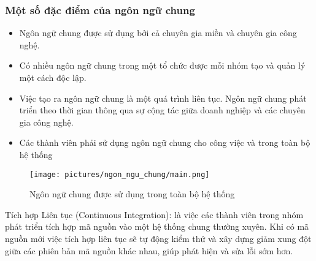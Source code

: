 \subsubsection{Một số đặc điểm của ngôn ngữ chung}

\begin{itemize}

    \item Ngôn ngữ chung được sử dụng bởi cả chuyên gia  miền    và chuyên gia công nghệ.

    \item Có nhiều ngôn ngữ chung trong một tổ chức được mỗi nhóm tạo và quản lý một cách độc lập.

    \item Việc tạo ra ngôn ngữ chung là một quá trình liên tục. Ngôn ngữ chung phát triển theo thời gian thông qua sự cộng tác giữa doanh nghiệp và các chuyên gia công nghệ.

    \item Các thành viên phải sử dụng ngôn ngữ chung cho công việc và trong toàn bộ hệ thống

\end{itemize}

\begin{figure}[H]

    \centering

    \texttt{[image: pictures/ngon\_ngu\_chung/main.png]}

    \caption{Ngôn ngữ chung được sử dụng trong toàn bộ hệ thống}

\end{figure}







Tích hợp Liên tục (Continuous Integration): là việc các thành viên trong nhóm phát triển tích hợp mã nguồn vào một hệ thống chung thường xuyên. Khi có mã nguồn mới việc tích hợp liên tục sẽ tự động kiểm thử và xây dựng giảm xung đột giữa các phiên bản mã nguồn khác nhau, giúp phát hiện và sửa lỗi sớm hơn.




